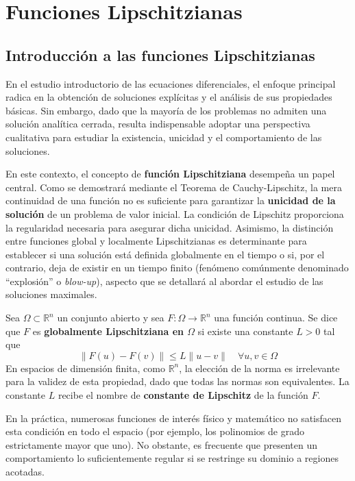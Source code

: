 \section{Funciones Lipschitzianas}

\subsection{Introducción a las funciones Lipschitzianas}
En el estudio introductorio de las ecuaciones diferenciales, el enfoque principal radica en la obtención de soluciones explícitas y el análisis de sus propiedades básicas. Sin embargo, dado que la mayoría de los problemas no admiten una solución analítica cerrada, resulta indispensable adoptar una perspectiva cualitativa para estudiar la existencia, unicidad y el comportamiento de las soluciones.

En este contexto, el concepto de \textbf{función Lipschitziana} desempeña un papel central. Como se demostrará mediante el Teorema de Cauchy-Lipschitz, la mera continuidad de una función no es suficiente para garantizar la \textbf{unicidad de la solución} de un problema de valor inicial. La condición de Lipschitz proporciona la regularidad necesaria para asegurar dicha unicidad. Asimismo, la distinción entre funciones global y localmente Lipschitzianas es determinante para establecer si una solución está definida globalmente en el tiempo o si, por el contrario, deja de existir en un tiempo finito (fenómeno comúnmente denominado ``explosión'' o \textit{blow-up}), aspecto que se detallará al abordar el estudio de las soluciones maximales.

\begin{definición}
    Sea $\Omega \subset \mathbb{R}^n$ un conjunto abierto y sea $F : \Omega \to \mathbb{R}^n$ una función continua. Se dice que $F$ es \textbf{globalmente Lipschitziana en $\Omega$} si existe una constante $L > 0$ tal que
    \[
        \| F(u) - F(v) \| \leq L \| u - v \| \quad \forall u, v \in \Omega
    \]
    En espacios de dimensión finita, como $\mathbb{R}^n$, la elección de la norma es irrelevante para la validez de esta propiedad, dado que todas las normas son equivalentes. La constante $L$ recibe el nombre de \textbf{constante de Lipschitz} de la función $F$.
\end{definición}

En la práctica, numerosas funciones de interés físico y matemático no satisfacen esta condición en todo el espacio (por ejemplo, los polinomios de grado estrictamente mayor que uno). No obstante, es frecuente que presenten un comportamiento lo suficientemente regular si se restringe su dominio a regiones acotadas.

